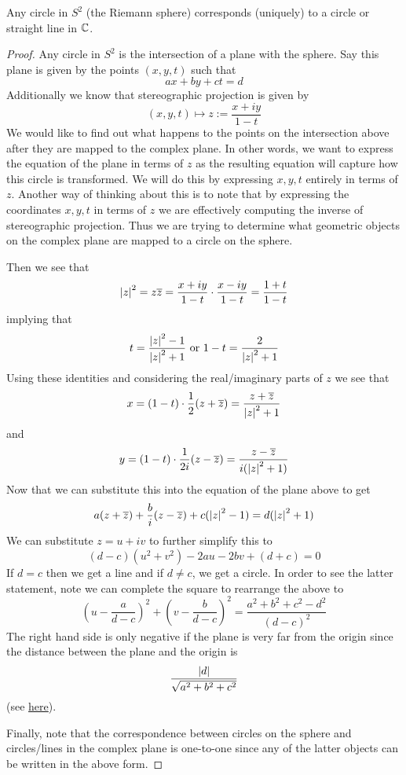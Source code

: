 \begin{lemma}
Any circle in $S^2$ (the Riemann sphere) corresponds (uniquely) to a circle or straight line in $\mathbb{C}$.
\end{lemma}
\begin{proof}
Any circle in $S^2$ is the intersection of a plane with the sphere. Say this plane is given by the points $(x, y, t)$ such that 
$$ ax + by + ct = d $$
Additionally we know that stereographic projection is given by 
$$ (x, y, t) \mapsto z := \frac{x + iy}{1 - t} $$
We would like to find out what happens to the points on the intersection above after they are mapped to the complex plane. In other words, we want to express the equation of the plane in terms of $z$ as the resulting equation will capture how this circle is transformed. We will do this by expressing $x, y, t$ entirely in terms of $z$. Another way of thinking about this is to note that by expressing the coordinates $x, y, t$ in terms of $z$ we are effectively computing the inverse of stereographic projection. Thus we are trying to determine what geometric objects on the complex plane are mapped to a circle on the sphere.

Then we see that 
$$ \left|z\right|^2 = z \overline{z} = \frac{x + iy}{1 - t} \cdot \frac{x - iy}{1 - t} = \frac{1 + t}{1 - t} $$
implying that 
$$t = \frac{\left|z\right|^2 - 1}{\left|z\right|^2 + 1} \text{ or } 1 - t = \frac{2}{\left|z\right|^2 + 1}$$
Using these identities and considering the real/imaginary parts of $z$ we see that 
$$ x = (1 - t) \cdot \frac{1}{2}(z + \overline{z}) = \frac{z + \overline{z}}{\left|z\right|^2 + 1}$$
and
$$y = (1 - t) \cdot \frac{1}{2i} (z - \overline{z}) = \frac{z - \overline{z}}{i(\left|z\right|^2 + 1)}$$
Now that we can substitute this into the equation of the plane above to get 
$$ a(z + \overline{z}) + \frac{b}{i}(z - \overline{z}) + c(\left|z\right|^2 - 1) = d(\left|z\right|^2 + 1) $$
We can substitute $z = u + iv$ to further simplify this to
$$(d - c)(u^2 + v^2) - 2au - 2bv + (d + c) = 0$$
If $d = c$ then we get a line and if $d \neq c$, we get a circle. In order to see the latter statement, note we can complete the square to rearrange the above to 
$$ \left(u - \frac{a}{d - c}\right)^2 + \left(v - \frac{b}{d - c}\right)^2 = \frac{a^2 + b^2 + c^2 - d^2}{(d - c)^2} $$
The right hand side is only negative if the plane is very far from the origin since the distance between the plane and the origin is 
$$\frac{\left|d\right|}{\sqrt{a^2 + b^2 + c^2}} $$
(see \href{https://mathworld.wolfram.com/Point-PlaneDistance.html}{here}).

Finally, note that the correspondence between circles on the sphere and circles/lines in the complex plane is one-to-one since any of the latter objects can be written in the above form.
\end{proof}

